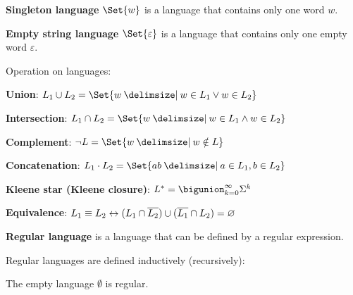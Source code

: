 \documentclass[a4paper,10pt]{article}
\begin{document}
\begin{terms}
    \item \textbf{Singleton language} $\Set{w}$ is a language that contains only one word $w$.

    \item \textbf{Empty string language} $\Set{\varepsilon}$ is a language that contains only one empty word $\varepsilon$.

    \item Operation on languages:

    \begin{terms}
        \item \textbf{Union}: $L_1 \union L_2 = \Set{w \given w \in L_1 \lor w \in L_2}$

        \item \textbf{Intersection}: $L_1 \intersection L_2 = \Set{w \given w \in L_1 \land w \in L_2}$

        \item \textbf{Complement}: $\neg{L} = \Set{w \given w \notin L}$

        \item \textbf{Concatenation}: $L_1 \cdot L_2 = \Set{ab \given a \in L_1, b \in L_2}$

        \item \textbf{Kleene star (Kleene closure)}: $L^* = \bigunion_{k = 0}^{\infty}\Sigma^k$
    \end{terms}

    \item \textbf{Equivalence}: $L_1 \equiv L_2 \mathrel{\leftrightarrow} (L_1 \cap \overline{L_2}) \cup (\overline{L_1} \cap L_2) = \varnothing$


    \item \textbf{Regular language} is a language that can be defined by a regular expression.

    Regular languages are defined inductively (recursively):

    \begin{terms}
        \item The empty language $\emptyset$ is regular.


\end{terms}
\end{terms}
\end{document}

